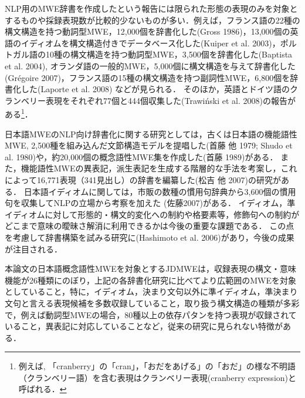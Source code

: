\documentclass[japanese]{jnlp_1.4}
\begin{document}
NLP用のMWE辞書を作成したという報告には限られた形態の表現のみを対象とするものや採録表現数が比較的少ないものが多い．例えば，フランス語の22種の構文構造を持つ動詞型MWE，12,000個を辞書化した(Gross 1986)，13,000個の英語のイディオムを構文構造付きでデータベース化した(Kuiper et al. 2003)，ポルトガル語の10種の構文構造を持つ動詞型MWE，3,500個を辞書化した(Baptista et al. 2004), オランダ語の一般的MWE，5,000個に構文構造を与えて辞書化した(Gr\'egoire 2007)，フランス語の15種の構文構造を持つ副詞性MWE，6,800個を辞書化した(Laporte et al. 2008) などが見られる．
そのほか，英語とドイツ語のクランベリー表現をそれぞれ77個と444個収集した(Trawi\'nski et al. 2008)の報告がある\footnote{例えば, 「cranberry」の「cran」，「おだをあげる」の「おだ」の様な不明語（クランベリー語）を含む表現はクランベリー表現(cranberry expression)と呼ばれる．}．

日本語MWEのNLP向け辞書化に関する研究としては，古くは日本語の機能語性MWE, 2,500種を組み込んだ文節構造モデルを提唱した(首藤 他 1979; Shudo et al. 1980)や，約20,000個の概念語性MWE集を作成した(首藤 1989)がある．
また，機能語性MWEの異表記，派生表記を生成する階層的な手法を考案し，これによって16,771表現（341見出し）の辞書を編纂した(松吉 他 2007)の研究がある．
日本語イディオムに関しては，市販の数種の慣用句辞典から3,600個の慣用句を収集してNLPの立場から考察を加えた (佐藤2007)がある．
イディオム，準イディオムに対して形態的・構文的変化への制約や格要素等，修飾句への制約がどこまで意味の曖昧さ解消に利用できるかは今後の重要な課題である．
この点を考慮して辞書構築を試みる研究に(Hashimoto et al. 2006)があり，今後の成果が注目される．

本論文の日本語概念語性MWEを対象とするJDMWEは，収録表現の構文・意味機能が26種類にのぼり，上記の各辞書化研究に比べてより広範囲のMWEを対象としていること，特に，イディオム，決まり文句以外に準イディオム，準決まり文句と言える表現候補を多数収録していること，取り扱う構文構造の種類が多彩で，例えば動詞型MWEの場合，80種以上の依存パタンを持つ表現が収録されていること，異表記に対応していることなど，従来の研究に見られない特徴がある．
\end{document}
